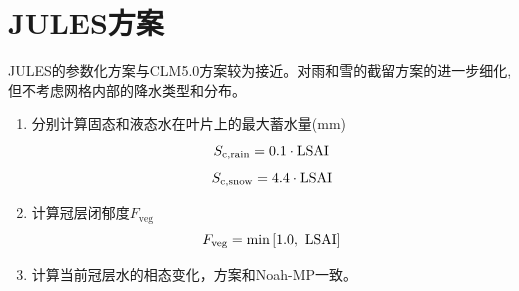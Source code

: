 \section{JULES方案}
JULES的参数化方案与CLM5.0方案较为接近。对雨和雪的截留方案的进一步细化,但不考虑网格内部的降水类型和分布。
\begin{enumerate}
  \item 分别计算固态和液态水在叶片上的最大蓄水量(mm)\\
    \begin{equation}
      S_{\mathrm{c,rain}}=0.1\cdot{\rm LSAI}\\
    \end{equation}
    \begin{equation}
      S_{\mathrm{c,snow}}=4.4\cdot{\rm LSAI}
    \end{equation}
  \item 计算冠层闭郁度$F_{\mathrm{veg}}$
    \begin{equation}
      F_{\mathrm{veg}} = \min\left[1.0,~{\rm LSAI}\right]
    \end{equation}

  \item 计算当前冠层水的相态变化，方案和Noah-MP一致。


\end{enumerate}
